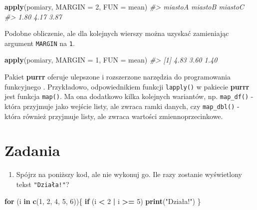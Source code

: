 \documentclass[paper=6in:9in,pagesize=pdftex,headinclude=on,footinclude=on,10pt]{scrbook}
\makeatletter
\newenvironment{Shaded}{\begin{snugshade}}{\end{snugshade}}
\newcommand{\CommentTok}[1]{\textcolor[rgb]{0.56,0.35,0.01}{\textit{#1}}}
\newcommand{\ControlFlowTok}[1]{\textcolor[rgb]{0.13,0.29,0.53}{\textbf{#1}}}
\newcommand{\DataTypeTok}[1]{\textcolor[rgb]{0.13,0.29,0.53}{#1}}
\newcommand{\DecValTok}[1]{\textcolor[rgb]{0.00,0.00,0.81}{#1}}
\newcommand{\KeywordTok}[1]{\textcolor[rgb]{0.13,0.29,0.53}{\textbf{#1}}}
\newcommand{\NormalTok}[1]{#1}
\newcommand{\OperatorTok}[1]{\textcolor[rgb]{0.81,0.36,0.00}{\textbf{#1}}}
\newcommand{\StringTok}[1]{\textcolor[rgb]{0.31,0.60,0.02}{#1}}
\providecommand{\tightlist}{%
  \setlength{\itemsep}{0pt}\setlength{\parskip}{0pt}}
\newenvironment{kframe}{%
\medskip{}
\setlength{\fboxsep}{.8em}
 \def\at@end@of@kframe{}%
 \ifinner\ifhmode%
  \def\at@end@of@kframe{\end{minipage}}%
  \begin{minipage}{\columnwidth}%
 \fi\fi%
 \def\FrameCommand##1{\hskip\@totalleftmargin \hskip-\fboxsep
 \colorbox{shadecolor}{##1}\hskip-\fboxsep
     \hskip-\linewidth \hskip-\@totalleftmargin \hskip\columnwidth}%
 \MakeFramed {\advance\hsize-\width
   \@totalleftmargin\z@ \linewidth\hsize
   \@setminipage}}%
 {\par\unskip\endMakeFramed%
 \at@end@of@kframe}
\newenvironment{rmdblock}[1]
  {
  \begin{itemize}
  \renewcommand{\labelitemi}{
    \raisebox{-.7\height}[0pt][0pt]{
      {\setkeys{Gin}{width=3em,keepaspectratio}\texttt{[image: images/\#1]}}
    }
  }
  \setlength{\fboxsep}{1em}
  \begin{kframe}
  \item
  }
  {
  \end{kframe}
  \end{itemize}
  }
\newenvironment{rmdinfo}
  {\begin{rmdblock}{compass}}
  {\end{rmdblock}}
\makeatother
\begin{document}
\begin{Shaded}
\begin{Highlighting}[]
\KeywordTok{apply}\NormalTok{(pomiary, }\DataTypeTok{MARGIN =} \DecValTok{2}\NormalTok{, }\DataTypeTok{FUN =}\NormalTok{ mean)}
\CommentTok{#> miastoA miastoB miastoC }
\CommentTok{#>    1.80    4.17    3.87}
\end{Highlighting}
\end{Shaded}

Podobne obliczenie, ale dla kolejnych wierszy można uzyskać zamieniając argument \texttt{MARGIN} na \texttt{1}.

\begin{Shaded}
\begin{Highlighting}[]
\KeywordTok{apply}\NormalTok{(pomiary, }\DataTypeTok{MARGIN =} \DecValTok{1}\NormalTok{, }\DataTypeTok{FUN =}\NormalTok{ mean)}
\CommentTok{#> [1] 4.83 3.60 1.40}
\end{Highlighting}
\end{Shaded}

\begin{rmdinfo}
Pakiet \textbf{purrr} oferuje ulepszone i rozszerzone narzędzia do programowania funkcyjnego \citep{R-purrr}.
Przykładowo, odpowiednikiem funkcji \texttt{lapply()} w pakiecie \textbf{purrr} jest funkcja \texttt{map()}.
Ma ona dodatkowo kilka kolejnych wariantów, np. \texttt{map\_df()} - która przyjmuje jako wejście listy, ale zwraca ramki danych, czy \texttt{map\_dbl()} - która również przyjmuje listy, ale zwraca wartości zmiennoprzecinkowe.
\end{rmdinfo}

\hypertarget{zadania}{%
\section{Zadania}\label{zadania}}

\begin{enumerate}
\def\labelenumi{\arabic{enumi})}
\tightlist
\item
  Spójrz na poniższy kod, ale nie wykonuj go.
  Ile razy zostanie wyświetlony tekst \texttt{"Działa!"}?
\end{enumerate}

\begin{Shaded}
\begin{Highlighting}[]
\ControlFlowTok{for}\NormalTok{ (i }\ControlFlowTok{in} \KeywordTok{c}\NormalTok{(}\DecValTok{1}\NormalTok{, }\DecValTok{2}\NormalTok{, }\DecValTok{4}\NormalTok{, }\DecValTok{5}\NormalTok{, }\DecValTok{6}\NormalTok{))\{}
    \ControlFlowTok{if}\NormalTok{ (i }\OperatorTok{<}\StringTok{ }\DecValTok{2} \OperatorTok{|}\StringTok{ }\NormalTok{i }\OperatorTok{>=}\StringTok{ }\DecValTok{5}\NormalTok{)}
      \KeywordTok{print}\NormalTok{(}\StringTok{"Działa!"}\NormalTok{)}
\NormalTok{\}}
\end{Highlighting}
\end{Shaded}
\end{document}
